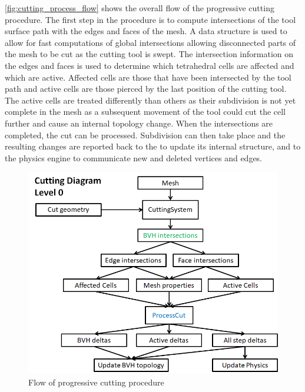 \autoref{fig:cutting_process_flow} shows the overall flow of the progressive cutting procedure. The first step in the procedure is to compute intersections of the tool surface path with the edges and faces of the mesh. A  data structure is used to allow for fast computations of global intersections allowing disconnected parts of the mesh to be cut as the cutting tool is swept. The intersection information on the edges and faces is used to determine which tetrahedral cells are affected and which are active. Affected cells are those that have been intersected by the tool path and active cells are those pierced by the last position of the cutting tool. The active cells are treated differently than others as their subdivision is not yet complete in the mesh as a subsequent movement of the tool could cut the cell further and cause an internal topology change.  When the intersections are completed, the cut can be processed. Subdivision can then take place and the resulting changes are reported back to the  to update its internal structure, and to the  physics engine to communicate new and deleted vertices and edges.

\begin{figure}
  \centering%
  \includegraphics[width=0.75\linewidth,frame]{figures/cutting/Process_cut.png}
  \caption{Flow of progressive cutting procedure}
  \label{fig:cutting_process_flow}
\end{figure}



